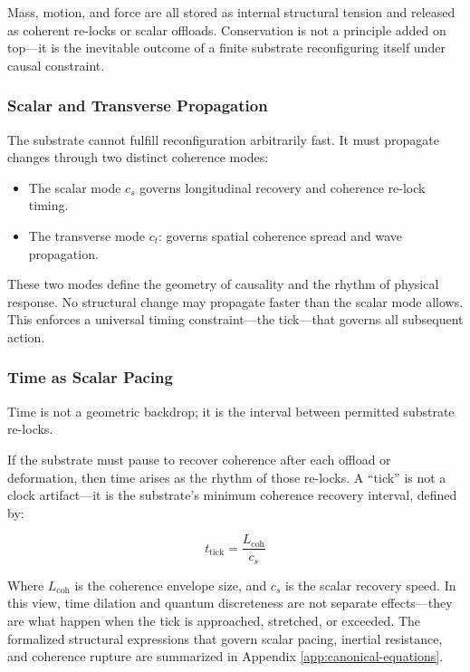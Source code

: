 \documentclass[entropy,article,submit,pdftex,moreauthors]{Definitions/mdpi}
\begin{document}
Mass, motion, and force are all stored as internal structural tension and released as coherent re-locks or scalar offloads. Conservation is not a principle added on top—it is the inevitable outcome of a finite substrate reconfiguring itself under causal constraint.

\subsubsection{Scalar and Transverse Propagation}

The substrate cannot fulfill reconfiguration arbitrarily fast. It must propagate changes through two distinct coherence modes:

\begin{itemize}
    \item The scalar mode \(c_s\) governs longitudinal recovery and coherence re-lock timing.
    \item The transverse mode \(c_t\): governs spatial coherence spread and wave propagation.
\end{itemize}

These two modes define the geometry of causality and the rhythm of physical response. No structural change may propagate faster than the scalar mode allows. This enforces a universal timing constraint—the tick—that governs all subsequent action.

\subsubsection{Time as Scalar Pacing}

Time is not a geometric backdrop; it is the interval between permitted substrate re-locks.

If the substrate must pause to recover coherence after each offload or deformation, then time arises as the rhythm of those re-locks. A “tick” is not a clock artifact—it is the substrate’s minimum coherence recovery interval, defined by:

\[
t_{\text{tick}} = \frac{L_{\text{coh}}}{c_s}
\]

Where \( L_{\text{coh}} \) is the coherence envelope size, and \( c_s \) is the scalar recovery speed. In this view, time dilation and quantum discreteness are not separate effects—they are what happen when the tick is approached, stretched, or exceeded. The formalized structural expressions that govern scalar pacing, inertial resistance, and coherence rupture are summarized in Appendix \ref{app:canonical-equations}.
\end{document}
